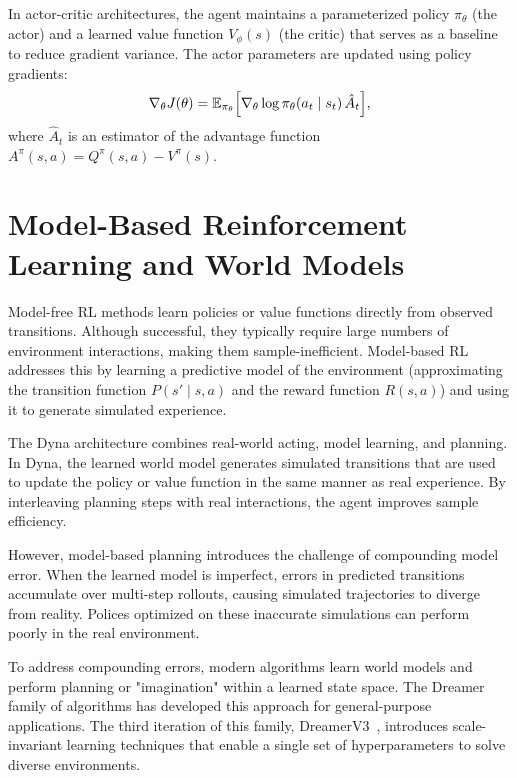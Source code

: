 In actor-critic architectures, the agent maintains a parameterized policy $\pi_\theta$ (the actor) and a learned value function $V_\phi(s)$ (the critic) that serves as a baseline to reduce gradient variance. The actor parameters are updated using policy gradients:
\begin{equation}
    \nabla_\theta J(\theta) = \mathbb{E}_{\pi_\theta} \Bigl[
        \nabla_\theta \log \pi_\theta(a_t \mid s_t) \, \hat{A}_t
    \Bigr],
    \label{eq:policy_gradient}
\end{equation}
where $\hat{A}_t$ is an estimator of the advantage function $A^\pi(s,a) = Q^\pi(s,a) - V^\pi(s)$.

\section{Model-Based Reinforcement Learning and World Models}
\label{sec:lit_model_based}

Model-free RL methods learn policies or value functions directly from observed transitions. Although successful, they typically require large numbers of environment interactions, making them sample-inefficient. Model-based RL addresses this by learning a predictive model of the environment (approximating the transition function $P(s' \mid s, a)$ and the reward function $R(s, a)$) and using it to generate simulated experience.

The Dyna architecture combines real-world acting, model learning, and planning. In Dyna, the learned world model generates simulated transitions that are used to update the policy or value function in the same manner as real experience. By interleaving planning steps with real interactions, the agent improves sample efficiency.

However, model-based planning introduces the challenge of compounding model error. When the learned model is imperfect, errors in predicted transitions accumulate over multi-step rollouts, causing simulated trajectories to diverge from reality. Polices optimized on these inaccurate simulations can perform poorly in the real environment.

To address compounding errors, modern algorithms learn world models and perform planning or "imagination" within a learned state space. The Dreamer family of algorithms has developed this approach for general-purpose applications. The third iteration of this family, DreamerV3~\citep{hafner2023dreamerv3}, introduces scale-invariant learning techniques that enable a single set of hyperparameters to solve diverse environments.

